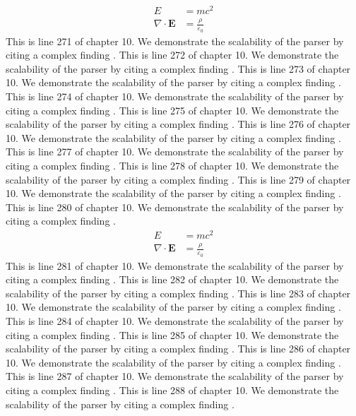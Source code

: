 \begin{align*}
  E &= mc^2 \\
  \nabla \cdot \mathbf{E} &= \frac{\rho}{\varepsilon_0}
\end{align*}
This is line 271 of chapter 10. We demonstrate the scalability of the parser by citing a complex finding \cite{ref10_271}.
This is line 272 of chapter 10. We demonstrate the scalability of the parser by citing a complex finding \cite{ref10_272}.
This is line 273 of chapter 10. We demonstrate the scalability of the parser by citing a complex finding \cite{ref10_273}.
This is line 274 of chapter 10. We demonstrate the scalability of the parser by citing a complex finding \cite{ref10_274}.
This is line 275 of chapter 10. We demonstrate the scalability of the parser by citing a complex finding \cite{ref10_275}.
This is line 276 of chapter 10. We demonstrate the scalability of the parser by citing a complex finding \cite{ref10_276}.
This is line 277 of chapter 10. We demonstrate the scalability of the parser by citing a complex finding \cite{ref10_277}.
This is line 278 of chapter 10. We demonstrate the scalability of the parser by citing a complex finding \cite{ref10_278}.
This is line 279 of chapter 10. We demonstrate the scalability of the parser by citing a complex finding \cite{ref10_279}.
This is line 280 of chapter 10. We demonstrate the scalability of the parser by citing a complex finding \cite{ref10_280}.
\begin{align*}
  E &= mc^2 \\
  \nabla \cdot \mathbf{E} &= \frac{\rho}{\varepsilon_0}
\end{align*}
This is line 281 of chapter 10. We demonstrate the scalability of the parser by citing a complex finding \cite{ref10_281}.
This is line 282 of chapter 10. We demonstrate the scalability of the parser by citing a complex finding \cite{ref10_282}.
This is line 283 of chapter 10. We demonstrate the scalability of the parser by citing a complex finding \cite{ref10_283}.
This is line 284 of chapter 10. We demonstrate the scalability of the parser by citing a complex finding \cite{ref10_284}.
This is line 285 of chapter 10. We demonstrate the scalability of the parser by citing a complex finding \cite{ref10_285}.
This is line 286 of chapter 10. We demonstrate the scalability of the parser by citing a complex finding \cite{ref10_286}.
This is line 287 of chapter 10. We demonstrate the scalability of the parser by citing a complex finding \cite{ref10_287}.
This is line 288 of chapter 10. We demonstrate the scalability of the parser by citing a complex finding \cite{ref10_288}.
